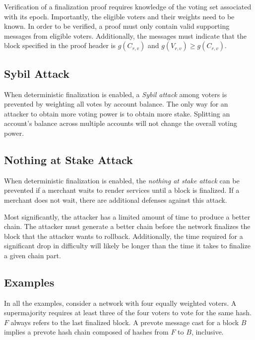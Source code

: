 Verification of a finalization proof requires knowledge of the voting set associated with its epoch.
Importantly, the eligible voters and their weights need to be known.
In order to be verified, a proof must only contain valid supporting messages from eligible voters.
Additionally, the messages must indicate that the block specified in the proof header is $g(C_{r,v})$ and $g(V_{r,v}) \geq g(C_{r,v})$.

\subsection{Sybil Attack}

When deterministic finalization is enabled, a \emph{Sybil attack} among voters is prevented by weighting all votes by account balance.
The only way for an attacker to obtain more voting power is to obtain more stake.
Splitting an account's balance across multiple accounts will not change the overall voting power.

\subsection{Nothing at Stake Attack}

When deterministic finalization is enabled, the \emph{nothing at stake attack} can be prevented if a merchant waits to render services until a block is finalized.
If a merchant does not wait, there are additional defenses against this attack.

Most significantly, the attacker has a limited amount of time to produce a better chain.
The attacker must generate a better chain before the network finalizes the block that the attacker wants to rollback.
Additionally, the time required for a significant drop in difficulty will likely be longer than the time it takes to finalize a given chain part.

\subsection{Examples}



In all the examples, consider a network with four equally weighted voters.
A supermajority requires at least three of the four voters to vote for the same hash.
$F$ always refers to the last finalized block.
A prevote message cast for a block $B$ implies a prevote hash chain composed of hashes from $F$ to $B$, inclusive.

